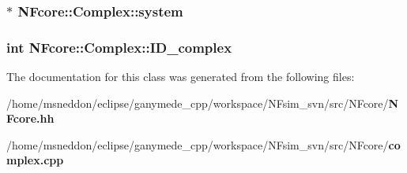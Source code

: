 \subsubsection{$\ast$ {\bf NFcore::Complex::system}\hspace{0.3cm}{\tt  [protected]}}\label{classNFcore_1_1Complex_507911a7d8e341fe531173a178011cc3}


\subsubsection{\setlength{\rightskip}{0pt plus 5cm}int {\bf NFcore::Complex::ID\_\-complex}\hspace{0.3cm}{\tt  [protected]}}\label{classNFcore_1_1Complex_fa83ffe4d89fe79396145cf245960d9d}




The documentation for this class was generated from the following files:\begin{CompactItemize}
\item 
/home/msneddon/eclipse/ganymede\_\-cpp/workspace/NFsim\_\-svn/src/NFcore/{\bf NFcore.hh}\item 
/home/msneddon/eclipse/ganymede\_\-cpp/workspace/NFsim\_\-svn/src/NFcore/{\bf complex.cpp}\end{CompactItemize}
